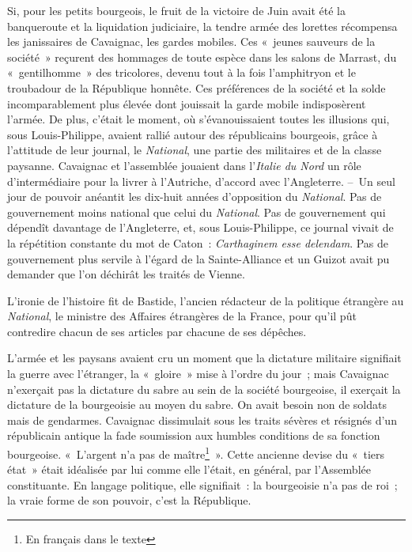 \documentclass[french,twoside]{book} %
\begin{document}
Si, pour les petits bourgeois, le fruit de la victoire de Juin avait été la banqueroute et la liquidation judiciaire, la tendre armée des lorettes récompensa les janissaires de Cavaignac, les gardes mobiles. Ces « jeunes sauveurs de la société » reçurent des hommages de toute espèce dans les salons de Marrast, du « gentilhomme » des tricolores, devenu tout à la fois l’amphitryon et le troubadour de la République honnête. Ces préférences de la société et la solde incomparablement plus élevée dont jouissait la garde mobile indisposèrent l’armée. De plus, c’était le moment, où s’évanouissaient toutes les illusions qui, sous Louis-Philippe, avaient rallié autour des républicains bourgeois, grâce à l’attitude de leur journal, le \emph{National}, une partie des militaires et de la classe paysanne. Cavaignac et l’assemblée jouaient dans l’\emph{Italie du Nord} un rôle d’intermédiaire pour la livrer à l’Autriche, d’accord avec l’Angleterre. – Un seul jour de pouvoir anéantit les dix-huit années d’opposition du \emph{National}. Pas de gouvernement moins national que celui du \emph{National}. Pas de gouvernement qui dépendît davantage de l’Angleterre, et, sous Louis-Philippe, ce journal vivait de la répétition constante du mot de Caton : \emph{Carthaginem esse delendam}. Pas de gouvernement plus servile à l’égard de la Sainte-Alliance et un Guizot avait pu demander que l’on déchirât les traités de Vienne.\par
L’ironie de l’histoire fit de Bastide, l’ancien rédacteur de la politique étrangère au \emph{National}, le ministre des Affaires étrangères de la France, pour qu’il pût contredire chacun de ses articles par chacune de ses dépêches.\par
L’armée et les paysans avaient cru un moment que la dictature militaire signifiait la guerre avec l’étranger, la « gloire » mise à l’ordre du jour ; mais Cavaignac n’exerçait pas la dictature du sabre au sein de la société bourgeoise, il exerçait la dictature de la bourgeoisie au moyen du sabre. On avait besoin non de soldats mais de gendarmes. Cavaignac dissimulait sous les traits sévères et résignés d’un républicain antique la fade soumission aux humbles conditions de sa fonction bourgeoise. « L’argent n’a pas de maître\footnote{En français dans le texte} ». Cette ancienne devise du « tiers état » était idéalisée par lui comme elle l’était, en général, par l’Assemblée constituante. En langage politique, elle signifiait : la bourgeoisie n’a pas de roi ; la vraie forme de son pouvoir, c’est la République.\par
\end{document}
